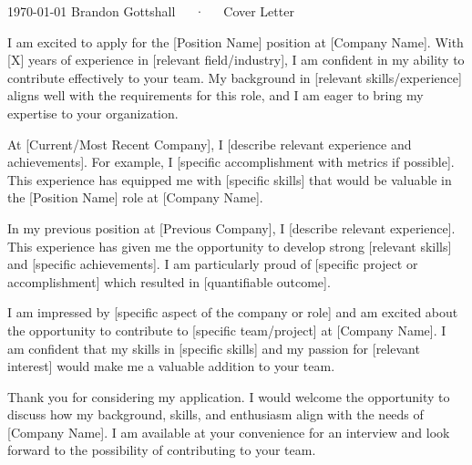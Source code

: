 \documentclass[11pt, a4paper]{../../src/common/awesome-cv}
\begin{document}
\makecvheader[R]

\makecvfooter
  {\today}
  {Brandon Gottshall~~~·~~~Cover Letter}
  {}

\makelettertitle


I am excited to apply for the [Position Name] position at [Company Name]. With [X] years of experience in [relevant field/industry], I am confident in my ability to contribute effectively to your team. My background in [relevant skills/experience] aligns well with the requirements for this role, and I am eager to bring my expertise to your organization.

At [Current/Most Recent Company], I [describe relevant experience and achievements]. For example, I [specific accomplishment with metrics if possible]. This experience has equipped me with [specific skills] that would be valuable in the [Position Name] role at [Company Name].

In my previous position at [Previous Company], I [describe relevant experience]. This experience has given me the opportunity to develop strong [relevant skills] and [specific achievements]. I am particularly proud of [specific project or accomplishment] which resulted in [quantifiable outcome].

I am impressed by [specific aspect of the company or role] and am excited about the opportunity to contribute to [specific team/project] at [Company Name]. I am confident that my skills in [specific skills] and my passion for [relevant interest] would make me a valuable addition to your team.

Thank you for considering my application. I would welcome the opportunity to discuss how my background, skills, and enthusiasm align with the needs of [Company Name]. I am available at your convenience for an interview and look forward to the possibility of contributing to your team.

\makeletterclosing
\end{document}
